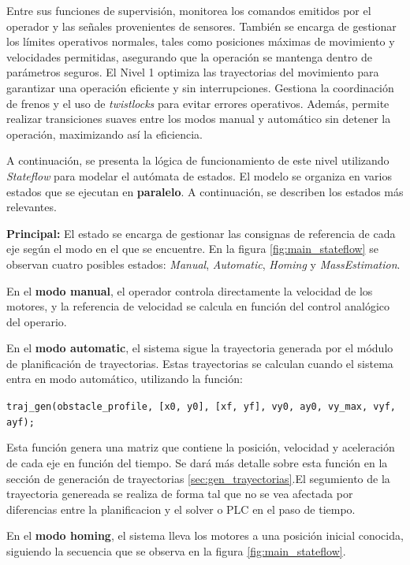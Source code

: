 \documentclass{article}
\begin{document}
        Entre sus funciones de supervisión, monitorea los comandos emitidos por el operador y las señales provenientes de sensores. También se encarga de gestionar los límites operativos normales, tales como posiciones máximas de movimiento y velocidades permitidas, asegurando que la operación se mantenga dentro de parámetros seguros.
        El Nivel 1 optimiza las trayectorias del movimiento para garantizar una operación eficiente y sin interrupciones. Gestiona la coordinación de frenos y el uso de \textit{twistlocks} para evitar errores operativos. Además, permite realizar transiciones suaves entre los modos manual y automático sin detener la operación, maximizando así la eficiencia.

        A continuación, se presenta la lógica de funcionamiento de este nivel utilizando \textit{Stateflow} para modelar el autómata de estados. El modelo se organiza en varios estados que se ejecutan en \textbf{paralelo}. A continuación, se describen los estados más relevantes.


        \textbf{Principal:} 
            El estado se encarga de gestionar las consignas de referencia de cada eje según el modo en el que se encuentre. En la figura \ref{fig:main_stateflow} se observan cuatro posibles estados: \textit{Manual}, \textit{Automatic}, \textit{Homing} y \textit{MassEstimation}. 

            En el \textbf{modo manual}, el operador controla directamente la velocidad de los motores, y la referencia de velocidad se calcula en función del control analógico del operario.

            En el \textbf{modo automatic}, el sistema sigue la trayectoria generada por el módulo de planificación de trayectorias. Estas trayectorias se calculan cuando el sistema entra en modo automático, utilizando la función:
            \begin{center}
            \texttt{traj\_gen(obstacle\_profile, [x0, y0], [xf, yf], vy0, ay0, vy\_max, vyf, ayf);}
            \end{center}
            Esta función genera una matriz que contiene la posición, velocidad y aceleración de cada eje en función del tiempo. Se dará más detalle sobre esta función en la sección de generación de trayectorias \ref{sec:gen_trayectorias}.El segumiento de la trayectoria genereada se realiza de forma tal que no se vea afectada por diferencias entre la planificacion y el solver o PLC en el paso de tiempo. 

            En el \textbf{modo homing}, el sistema lleva los motores a una posición inicial conocida, siguiendo la secuencia que se observa en la figura \ref{fig:main_stateflow}.
\end{document}
